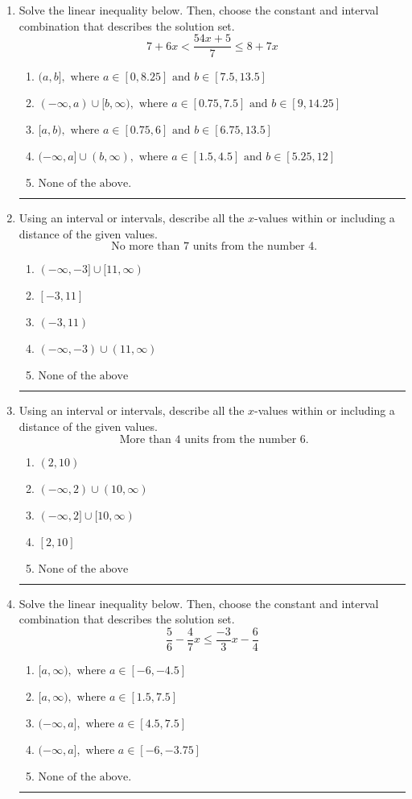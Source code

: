 \documentclass[14pt]{extbook}
\newcommand{\litem}[1]{\item#1\hspace*{-1cm}\rule{\textwidth}{0.4pt}}
\begin{document}
\begin{enumerate}
\litem{
Solve the linear inequality below. Then, choose the constant and interval combination that describes the solution set.\[ 7 + 6 x < \frac{54 x + 5}{7} \leq 8 + 7 x \]\begin{enumerate}[label=\Alph*.]
\item \( (a, b], \text{ where } a \in [0, 8.25] \text{ and } b \in [7.5, 13.5] \)
\item \( (-\infty, a) \cup [b, \infty), \text{ where } a \in [0.75, 7.5] \text{ and } b \in [9, 14.25] \)
\item \( [a, b), \text{ where } a \in [0.75, 6] \text{ and } b \in [6.75, 13.5] \)
\item \( (-\infty, a] \cup (b, \infty), \text{ where } a \in [1.5, 4.5] \text{ and } b \in [5.25, 12] \)
\item \( \text{None of the above.} \)

\end{enumerate} }
\litem{
Using an interval or intervals, describe all the $x$-values within or including a distance of the given values.\[ \text{ No more than } 7 \text{ units from the number } 4. \]\begin{enumerate}[label=\Alph*.]
\item \( (-\infty, -3] \cup [11, \infty) \)
\item \( [-3, 11] \)
\item \( (-3, 11) \)
\item \( (-\infty, -3) \cup (11, \infty) \)
\item \( \text{None of the above} \)

\end{enumerate} }
\litem{
Using an interval or intervals, describe all the $x$-values within or including a distance of the given values.\[ \text{ More than } 4 \text{ units from the number } 6. \]\begin{enumerate}[label=\Alph*.]
\item \( (2, 10) \)
\item \( (-\infty, 2) \cup (10, \infty) \)
\item \( (-\infty, 2] \cup [10, \infty) \)
\item \( [2, 10] \)
\item \( \text{None of the above} \)

\end{enumerate} }
\litem{
Solve the linear inequality below. Then, choose the constant and interval combination that describes the solution set.\[ \frac{5}{6} - \frac{4}{7} x \leq \frac{-3}{3} x - \frac{6}{4} \]\begin{enumerate}[label=\Alph*.]
\item \( [a, \infty), \text{ where } a \in [-6, -4.5] \)
\item \( [a, \infty), \text{ where } a \in [1.5, 7.5] \)
\item \( (-\infty, a], \text{ where } a \in [4.5, 7.5] \)
\item \( (-\infty, a], \text{ where } a \in [-6, -3.75] \)
\item \( \text{None of the above}. \)


\end{enumerate}}
\end{enumerate}
\end{document}
